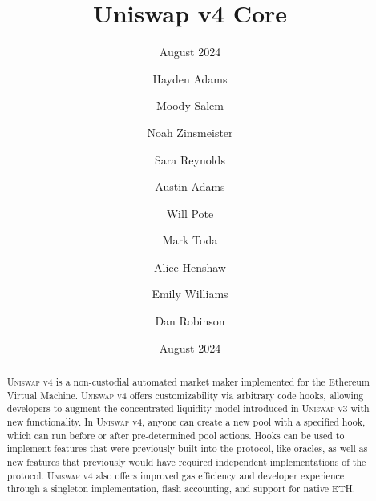 \documentclass[sigconf,nonacm,prologue,table]{acmart}
\numberwithin{equation}{section}
\theoremstyle{definition}
\theoremstyle{remark}
\begin{document}
\title{Uniswap v4 Core}
\subtitle{August 2024}
\date{August 2024}

\author{Hayden Adams}
\affiliation{}

\author{Moody Salem}
\affiliation{}

\author{Noah Zinsmeister}
\affiliation{}

\author{Sara Reynolds}
\affiliation{}

\author{Austin Adams}
\affiliation{}

\author{Will Pote}
\affiliation{}

\author{Mark Toda}
\affiliation{}

\author{Alice Henshaw}
\affiliation{}

\author{Emily Williams}
\affiliation{}

\author{Dan Robinson}
\affiliation{}

\begin{teaserfigure}
\caption*{
    \hspace{\textwidth}
    }
\end{teaserfigure}

\renewcommand{\shortauthors}{Adams et al.}

\begin{abstract}

\textsc{Uniswap v4} is a non-custodial automated market maker implemented for the Ethereum Virtual Machine. \textsc{Uniswap v4} offers customizability via arbitrary code hooks, allowing developers to augment the concentrated liquidity model introduced in \textsc{Uniswap v3} with new functionality. In \textsc{Uniswap v4}, anyone can create a new pool with a specified hook, which can run before or after pre-determined pool actions. Hooks can be used to implement features that were previously built into the protocol, like oracles, as well as new features that previously would have required independent implementations of the protocol. \textsc{Uniswap v4} also offers improved gas efficiency and developer experience through a singleton implementation, flash accounting, and support for native ETH.
\end{abstract}

\maketitle
\end{document}
